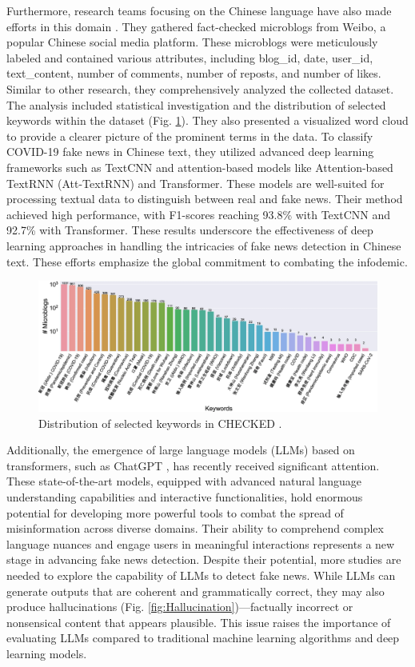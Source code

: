 Furthermore, research teams focusing on the Chinese language have also made efforts in this domain \cite{b7}. They gathered fact-checked microblogs from Weibo, a popular Chinese social media platform. These microblogs were meticulously labeled and contained various attributes, including blog\_id, date, user\_id, text\_content, number of comments, number of reposts, and number of likes.
Similar to other research, they comprehensively analyzed the collected dataset. The analysis included statistical investigation and the distribution of selected keywords within the dataset (Fig. \ref{fig:CHECKED}). They also presented a visualized word cloud to provide a clearer picture of the prominent terms in the data.
To classify COVID-19 fake news in Chinese text, they utilized advanced deep learning frameworks such as TextCNN and attention-based models like Attention-based TextRNN (Att-TextRNN) and Transformer. These models are well-suited for processing textual data to distinguish between real and fake news.
Their method achieved high performance, with F1-scores reaching 93.8\% with TextCNN and 92.7\% with Transformer. These results underscore the effectiveness of deep learning approaches in handling the intricacies of fake news detection in Chinese text.
These efforts emphasize the global commitment to combating the infodemic.\\
\begin{figure}
    \centering
    \includegraphics[width=1\linewidth]{img/CHECHED_Keywords.png}
    \caption{Distribution of selected keywords in CHECKED \cite{b7}.}
    \label{fig:CHECKED}
\end{figure}

Additionally, the emergence of large language models (LLMs) based on transformers, such as ChatGPT \cite{b8}, has recently received significant attention. These state-of-the-art models, equipped with advanced natural language understanding capabilities and interactive functionalities, hold enormous potential for developing more powerful tools to combat the spread of misinformation across diverse domains. Their ability to comprehend complex language nuances and engage users in meaningful interactions represents a new stage in advancing fake news detection.
Despite their potential, more studies are needed to explore the capability of LLMs to detect fake news. While LLMs can generate outputs that are coherent and grammatically correct, they may also produce hallucinations (Fig. \ref{fig:Hallucination})—factually incorrect or nonsensical content that appears plausible. This issue raises the importance of evaluating LLMs compared to traditional machine learning algorithms and deep learning models.\\

